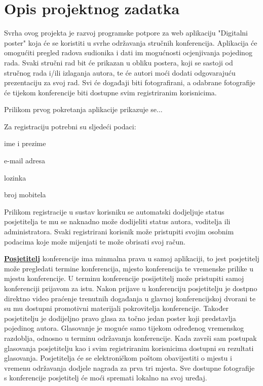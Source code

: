 \chapter{Opis projektnog zadatka}
		
		Svrha ovog projekta je razvoj programske potpore za web aplikaciju "Digitalni poster" koja će se koristiti u svrhe održavanja stručnih konferencija. Aplikacija će omogućiti pregled radova sudionika i dati im mogućnosti ocjenjivanja pojedinog rada. Svaki stručni rad bit će prikazan u obliku postera, koji se sastoji od stručnog rada i/ili izlaganja autora, te će autori moći dodati odgovarajuću prezentaciju za svoj rad. Svi će događaji biti fotografirani, a odabrane fotografije će tijekom konferencije biti dostupne svim registriranim korisnicima.

		Prilikom prvog pokretanja aplikacije prikazuje se...

		Za registraciju potrebni su sljedeći podaci:

		\begin{packed_item}
			\item {ime i prezime}
			\item {e-mail adresa}
			\item {lozinka}
			\item {broj mobitela}
		\end{packed_item}
		Prilikom registracije u sustav korisniku se automatski dodjeljuje status posjetitelja te mu se naknadno može dodijeliti status autora, voditelja ili administratora. Svaki registrirani korisnik može pristupiti svojim osobnim podacima koje može mijenjati te može obrisati svoj račun.

		\textbf{\underline{Posjetitelj}} konferencije ima minmalna prava u samoj aplikaciji, to jest posjetitelj može pregledati termine konferencija, mjesto konferencija te vremenske prilike u mjestu konferencije. U terminu konferencije posijetitelj može pristupiti samoj konferenciji prijavom za istu. Nakon prijave u konferenciju posjetitelju je dostpno direktno video praćenje trenutnih događanja u glavnoj konferencijskoj dvorani te su mu dostupni promotivni materijali pokrovitelja konferencije. Također posjetitelju je dodijeljno pravo glasa za točno jedan poster koji predstavlja pojedinog autora. Glasovanje je moguće samo tijekom određenog vremenskog razdoblja, odnosno u terminu održavanja konferencije. Kada završi sam postupak glasovanja posjetitelju kao i svim registriranim korisnicima dostupni su rezultati glasovanja. Posjetitelja će se elektroničkom poštom obavijestiti o mjestu i vremenu održavanja dodjele nagrada za prva tri mjesta. Sve dostupne fotografije s konferencije posjetitelj će moći spremati lokalno na svoj uređaj.

